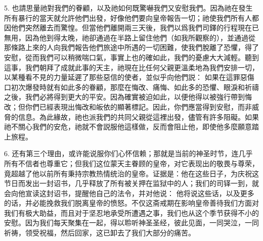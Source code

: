 5. 也請思量祂對我們的眷顧，以及祂如何既驚嚇我們又安慰我們。因為祂在發生所有暴行的當天就允許他們出發，好像他們要向皇帝報告一切；祂使我們所有人都因他們突然離去而驚惶。但當他們離開兩三天後，我們以爲我們司鐸的行程現在已無用，因為他到得太晚，祂卻通過在半路上留住他們（如我所觀察的），並通過從那條路上來的人向我們報告他們旅途中所遇的一切困難，使我們脫離了恐懼，得了安慰，從而我們可以稍微喘口氣，事實上也的確如此，我們的憂慮大大減輕。聽到這事，我們朝拜了成就此事的天主，祂現在比任何父親更溫柔地為我們安排一切，以某種看不見的力量延遲了那些惡信的使者，並似乎向他們説： 如果在這罪惡傷口初次爆發時就有如此多的眷顧，那麼在悔改、痛悔、如此多的恐懼、眼淚和祈禱之後，我們必將得到更大的平安。因為確實被迫如此，以便他得以被強行帶到悔改；但你們已經表現出悔改和皈依的顯著標記。因此，你們應當得到安慰，而非威脅的信息。為此緣故，祂也派我們的共同父親從這裡出發，儘管有許多阻礙。如果祂不關心我們的安危，祂就不會説服他這樣做，反而會阻止他，即使他多麼願意踏上旅程。\par

6. 还有第三个理由，或许能说服你们心怀信赖；那就是当前的神圣时节，连几乎所有不信者也尊重它；但我们这位蒙天主眷顾的皇帝，对它表现出的敬畏与尊荣，竟超越了他以前所有秉持宗教热情统治的皇帝。证据是：他在这些日子，为庆祝这节日而发出一封诏书，几乎释放了所有被关押在监狱中的人；我们的司铎一到，就会向他宣读这封诏书，提醒他自己的法令，并对他说： 他将说这些话，以及更多的话，并必能挽救我们脱离皇帝的愤怒。不仅这斋戒期在影响皇帝善待我们方面对我们有极大助益，而且对于坚忍地承受所遭遇之事，我们也从这个季节获得不小的安慰。因为我们每天聚集在一起，得以聆听神圣圣经，彼此见面，一同哭泣，一同祈祷，领受祝福，然后回家，这已卸去了我们大部分的痛苦。\par

